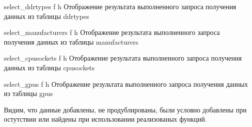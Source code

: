 {select_ddrtypes} %
{f} %
{h} %
{\textwidth} %
{Отображение результата выполненного запроса получения данных из таблицы ddrtypes} %

{select_manufacturers} %
{f} %
{h} %
{\textwidth} %
{Отображение результата выполненного запроса получения данных из таблицы manufacturers} %

{select_cpusockets} %
{f} %
{h} %
{\textwidth} %
{Отображение результата выполненного запроса получения данных из таблицы cpusockets} %

{select_gpus} %
{f} %
{h} %
{\textwidth} %
{Отображение результата выполненного запроса получения данных из таблицы gpus} %

Видим, что данные добавлены, не продублированы, были условно добавлены при остутствии или найдены при использовании реализованых функций.
